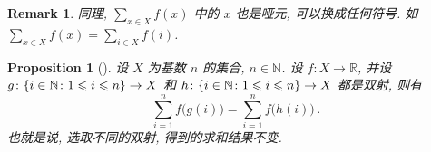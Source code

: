 \documentclass[UTF8]{ctexart}
\theoremstyle{mystyle}
\newtheorem{proposition}{Proposition}[section]
\theoremstyle{myremark}
\newtheorem*{remark}{Remark}
\theoremstyle{plain}
\newcommand{\R}{\mathbb R}
\newcommand{\N}{\mathbb N}
\DeclarePairedDelimiter\set{\{}{\}}
\begin{document}
\begin{remark}
    同理, $ \displaystyle \sum_{x \in X} f(x) $ 中的 $ x $ 也是哑元, 可以换成任何符号. 如 $ \displaystyle \sum_{x \in X} f(x) = \sum_{i \in X} f(i) $.
\end{remark}

\begin{proposition}[] \label{well_defined_1}
    设 $ X $ 为基数 $ n $ 的集合, $ n \in \N $. 设 $ f \colon X \to \R $, 并设 $ g \colon \set{i \in \N \colon 1 \leqslant i \leqslant n} \to X $ 和 $ h \colon \set{i \in \N \colon 1 \leqslant i \leqslant n} \to X $ 都是双射, 则有 \[ \sum_{i = 1}^{n} f \big( g(i) \big) = \sum_{i = 1}^{n} f \big( h(i) \big) \,.\] 也就是说, 选取不同的双射, 得到的求和结果不变.
\end{proposition}
\end{document}
